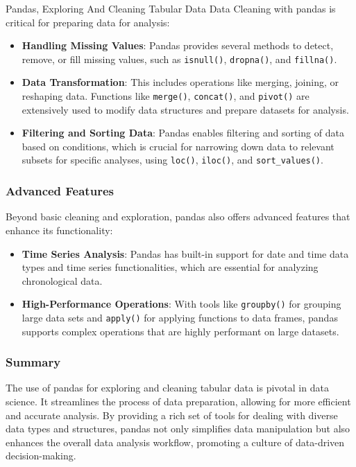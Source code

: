 \begin{notes}{Pandas, Exploring And Cleaning Tabular Data}
    Data Cleaning with pandas is critical for preparing data for analysis:
    \begin{itemize}
        \item \textbf{Handling Missing Values}: Pandas provides several methods to detect, remove, or fill missing values, such as \texttt{isnull()}, \texttt{dropna()}, and \texttt{fillna()}.
        \item \textbf{Data Transformation}: This includes operations like merging, joining, or reshaping data. Functions like \texttt{merge()}, \texttt{concat()}, and \texttt{pivot()} are extensively 
        used to modify data structures and prepare datasets for analysis.
        \item \textbf{Filtering and Sorting Data}: Pandas enables filtering and sorting of data based on conditions, which is crucial for narrowing down data to relevant subsets for specific analyses, 
        using \texttt{loc()}, \texttt{iloc()}, and \texttt{sort\_values()}.
    \end{itemize}
    
    \subsubsection*{Advanced Features}
    
    Beyond basic cleaning and exploration, pandas also offers advanced features that enhance its functionality:
    \begin{itemize}
        \item \textbf{Time Series Analysis}: Pandas has built-in support for date and time data types and time series functionalities, which are essential for analyzing chronological data.
        \item \textbf{High-Performance Operations}: With tools like \texttt{groupby()} for grouping large data sets and \texttt{apply()} for applying functions to data frames, pandas supports complex operations 
        that are highly performant on large datasets.
    \end{itemize}
    
    \subsubsection*{Summary}
    
    The use of pandas for exploring and cleaning tabular data is pivotal in data science. It streamlines the process of data preparation, allowing for more efficient and accurate analysis. By providing 
    a rich set of tools for dealing with diverse data types and structures, pandas not only simplifies data manipulation but also enhances the overall data analysis workflow, promoting a culture of 
    data-driven decision-making.    
\end{notes}